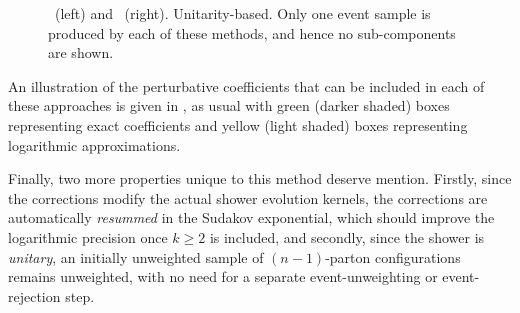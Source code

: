 \begin{figure}[t]
\begin{center}%
\caption{\Py~(left) and \Vc~(right). Unitarity-based. Only one event
 sample is produced by 
  each of these methods, and hence no sub-components are shown. 
\label{fig:match-unitary}}
\end{center}
\end{figure}
An illustration of the perturbative coefficients that can be 
included in each of  these approaches is given in
, as usual with green (darker shaded) boxes
representing exact coefficients and yellow (light shaded) boxes
representing logarithmic approximations. 

%
%
Finally, two more
properties unique to this method deserve mention. Firstly, 
since the corrections modify the actual shower evolution kernels, the
corrections are automatically \emph{resummed} in the Sudakov
exponential, which should improve the logarithmic precision once
$k\ge2$ is included, 
and secondly, since the shower is \emph{unitary},  an initially unweighted sample
of $(n-1)$-parton configurations remains unweighted, with 
no need for a separate event-unweighting or event-rejection
step. 


